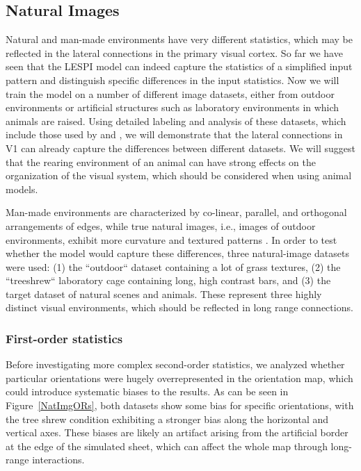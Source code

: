 \subsection{Natural Images}

Natural and man-made environments have very different statistics,
which may be reflected in the lateral connections in the primary
visual cortex. So far we have seen that the LESPI model can indeed
capture the statistics of a simplified input pattern and distinguish
specific differences in the input statistics. Now we will train the
model on a number of different image datasets, either from outdoor
environments or artificial structures such as laboratory environments
in which animals are raised. Using detailed labeling and analysis of
these datasets, which include those used by \cite{Perrinet2015} and
\cite{Serre2007}, we will demonstrate that the lateral connections in
V1 can already capture the differences between different datasets.  We
will suggest that the rearing environment of an animal can have strong
effects on the organization of the visual system, which should be
considered when using animal models.

Man-made environments are characterized by co-linear, parallel, and
orthogonal arrangements of edges, while true natural images, i.e.,
images of outdoor environments, exhibit more curvature and textured
patterns \citep{Perrinet2015}. In order to test whether the model
would capture these differences, three natural-image datasets were
used: (1) the ``outdoor`` dataset containing a lot of grass textures,
(2) the ``treeshrew`` laboratory cage containing long, high contrast
bars, and (3) the \cite{Serre2007} target dataset of natural scenes
and animals. These represent three highly distinct visual
environments, which should be reflected in long range connections.

\subsubsection*{First-order statistics}

Before investigating more complex second-order statistics, we analyzed
whether particular orientations were hugely overrepresented in the
orientation map, which could introduce systematic biases to the
results. As can be seen in Figure~\ref{NatImgORs}, both datasets show
some bias for specific orientations, with the tree shrew condition
exhibiting a stronger bias along the horizontal and vertical
axes. These biases are likely an artifact arising from the artificial
border at the edge of the simulated sheet, which can affect the whole
map through long-range interactions.

